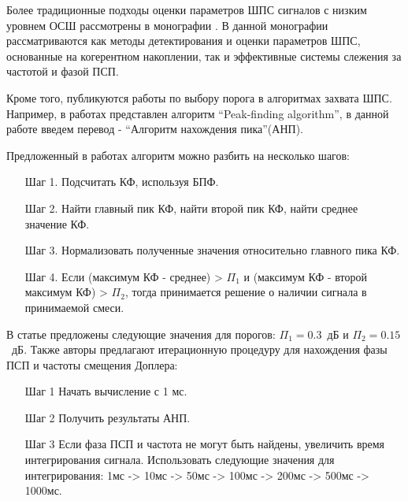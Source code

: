 Более традиционные подходы оценки параметров ШПС сигналов с низким уровнем ОСШ рассмотрены в монографии \cite{ziedan-book}.
В данной монографии рассматриваются как методы детектирования и оценки параметров ШПС, основанные на когерентном накоплении, так и эффективные
системы слежения за частотой и фазой ПСП.

Кроме того, публикуются работы по выбору порога в алгоритмах захвата ШПС. Например, в работах \cite{2max_ieee, 2max_article} представлен алгоритм
\textquotedblleft{Peak-finding algorithm}\textquotedblright,
в данной работе введем перевод -
\textquotedblleft{Алгоритм нахождения пика}\textquotedblright (АНП). 

Предложенный в работах алгоритм можно разбить на несколько шагов:
\begin{itemize}
	\item[Шаг 1.] Подсчитать КФ, используя БПФ.
	\item[Шаг 2.] Найти главный пик КФ, найти второй пик КФ, найти среднее значение КФ.
	\item[Шаг 3.] Нормализовать полученные значения относительно главного пика КФ.
	\item[Шаг 4.] Если (максимум КФ - среднее) > ${\Pi_1}$ и (максимум КФ - 
		второй максимум КФ) > ${\Pi_2}$, тогда принимается решение о наличии сигнала в принимаемой смеси. 
\end{itemize}

В статье \cite{2max_ieee} предложены следующие значения для порогов: \mbox{${\Pi_1} = 0.3$ дБ} и  \mbox{${\Pi_2} = 0.15$ дБ.}
Также авторы предлагают итерационную процедуру для нахождения фазы ПСП и частоты смещения Доплера:
\begin{itemize}
	\item[Шаг 1] Начать вычисление с 1 мс.
	\item[Шаг 2] Получить результаты АНП.
	\item[Шаг 3] Если фаза ПСП и частота не могут быть найдены, увеличить время интегрирования сигнала.
		Использовать следующие значения для интегрирования: 1мс -> 10мс -> 50мс -> 100мс -> 200мс -> 500мс -> 1000мс.
\end{itemize}

